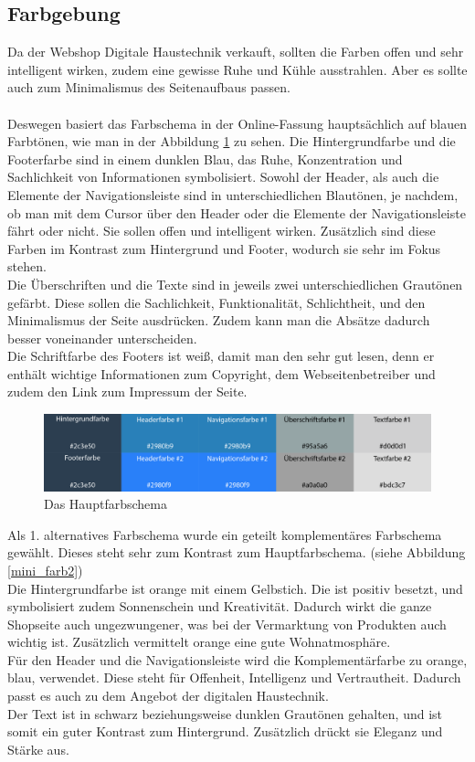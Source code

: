 	\subsection{Farbgebung}
	\label{farb_mini}
Da der Webshop Digitale Haustechnik verkauft, sollten die Farben offen und sehr intelligent wirken, zudem eine gewisse Ruhe und Kühle ausstrahlen. Aber es sollte auch zum Minimalismus des Seitenaufbaus passen.
\\
\\
Deswegen basiert das Farbschema in der Online-Fassung hauptsächlich auf blauen Farbtönen, wie man in der Abbildung \ref{mini_farb1} zu sehen. Die Hintergrundfarbe und die Footerfarbe sind in einem dunklen Blau, das Ruhe, Konzentration und Sachlichkeit von Informationen symbolisiert. 
Sowohl der Header, als auch die Elemente der Navigationsleiste sind in unterschiedlichen Blautönen, je nachdem, ob man mit dem Cursor über den Header oder die Elemente der Navigationsleiste fährt oder nicht. Sie sollen offen und intelligent wirken. Zusätzlich sind diese Farben im Kontrast zum Hintergrund und Footer, wodurch sie sehr im Fokus stehen.
\\
Die Überschriften und die Texte sind in jeweils zwei unterschiedlichen Grautönen gefärbt. Diese sollen die Sachlichkeit, Funktionalität, Schlichtheit, und den Minimalismus der Seite ausdrücken. Zudem kann man die Absätze dadurch besser voneinander unterscheiden.
\\
Die Schriftfarbe des Footers ist weiß, damit man den sehr gut lesen, denn er enthält wichtige Informationen zum Copyright, dem Webseitenbetreiber und zudem den Link zum Impressum der Seite. 
\begin{figure} [hp]
\includegraphics[width=\textwidth]{./img/mini_farb1.png}
\caption{Das Hauptfarbschema}
\label{mini_farb1}
\end{figure}

Als 1. alternatives Farbschema wurde ein geteilt komplementäres Farbschema gewählt. Dieses steht sehr zum Kontrast zum Hauptfarbschema. (siehe Abbildung \ref{mini_farb2}) 
\\
Die Hintergrundfarbe ist orange mit einem Gelbstich. Die ist positiv besetzt, und symbolisiert zudem Sonnenschein und Kreativität. Dadurch wirkt die ganze Shopseite auch ungezwungener, was bei der Vermarktung von Produkten auch wichtig ist. Zusätzlich vermittelt orange eine gute Wohnatmosphäre.
\\
Für den Header und die Navigationsleiste wird die Komplementärfarbe zu orange, blau, verwendet. Diese steht für Offenheit, Intelligenz und Vertrautheit. Dadurch passt es auch zu dem Angebot der digitalen Haustechnik. 
\\
Der Text ist in schwarz beziehungsweise dunklen Grautönen gehalten, und ist somit ein guter Kontrast zum Hintergrund. Zusätzlich drückt sie Eleganz und Stärke aus.

